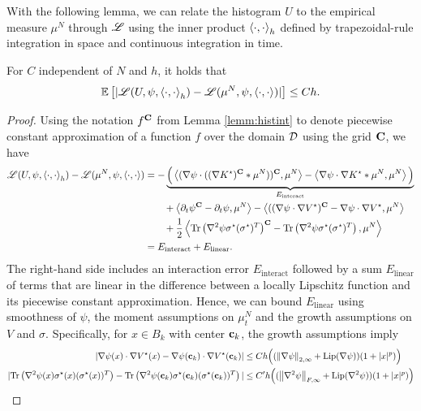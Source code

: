 \documentclass[english,reqno]{amsart}
\begin{document}
With the following lemma, we can relate the histogram $U$ to the empirical measure $\mu^N$ through $\mathscr{L}$ using the inner product $\left\langle\cdot,\cdot\right\rangle_h$ defined by trapezoidal-rule integration in space and continuous integration in time. 


\begin{lemm}\label{diffcont}
For $C$ independent of $N$ and $h$, it holds that
\[\mathbb{E}\left[|\mathscr{L}(U,\psi, \left\langle \cdot,\cdot\right\rangle_h)-\mathscr{L}(\mu^N, \psi, \left\langle\cdot,\cdot\right\rangle)|\right]\leq Ch.\]
\end{lemm}
\begin{proof}
Using the notation $f^{\mathbf{C}}$ from Lemma \ref{lemm:histint} to denote piecewise constant approximation of a function $f$ over the domain ${\mathcal{D}}$ using the grid $\mathbf{C}$, we have
\begin{align*}
\mathscr{L}(U,\psi, \left\langle \cdot,\cdot\right\rangle_h)-\mathscr{L}(\mu^N, \psi, \left\langle\cdot,\cdot\right\rangle) &= -\underbrace{\Big(\left\langle (\nabla \psi\cdot((\nabla K^\star)^{\mathbf{C}}*\mu^N))^{\mathbf{C}},\mu^N\right\rangle-\left\langle \nabla \psi\cdot\nabla K^\star*\mu^N,\mu^N\right\rangle\Big)}_{E_{\text{interact}}}\\
&\qquad + \left\langle \partial_t \psi^{\mathbf{C}} - \partial_t \psi, \mu^N\right\rangle -\left\langle ((\nabla \psi\cdot\nabla V^\star)^{\mathbf{C}}-\nabla \psi\cdot\nabla V^\star,\mu^N\right\rangle \\
&\qquad + \frac{1}{2}\left\langle \text{Tr}\left(\nabla^2 \psi\sigma^\star (\sigma^\star)^T\right)^{\mathbf{C}}-\text{Tr}\left(\nabla^2\psi\sigma^\star (\sigma^\star)^T\right), \mu^N\right\rangle\\
&= E_{\text{interact}}+E_{\text{linear}}.
\end{align*}
The right-hand side includes an interaction error $E_{\text{interact}}$ followed by a sum $E_{\text{linear}}$ of terms that are linear in the difference between a locally Lipschitz function and its piecewise constant approximation. Hence, we can bound $E_{\text{linear}}$ using smoothness of $\psi$, the moment assumptions on $\mu^N_t$ and the growth assumptions on $V$ and $\sigma$. Specifically, for $x\in B_k$ with center $\mathbf{c}_k$, the growth assumptions imply
\begin{align*}
|\nabla \psi(x)\cdot \nabla V^\star(x)-\nabla \psi(\cbf_k)\cdot \nabla V^\star(\cbf_k)|&\leq Ch\Big((\nrm{\nabla\psi}_{2,\infty}+\text{Lip}(\nabla \psi))(1+|x|^p)\Big)\\
|\text{Tr}\left(\nabla^2 \psi(x)\sigma^\star(x) (\sigma^\star(x))^T\right)-\text{Tr}\left(\nabla^2 \psi(\cbf_k)\sigma^\star(\cbf_k) (\sigma^\star(\cbf_k))^T\right)|&\leq C'h\Big((\nrm{\nabla^2\psi}_{F,\infty}+\text{Lip}(\nabla^2\psi))(1+|x|^p)\Big)

\end{align*}
\end{proof}
\end{document}
